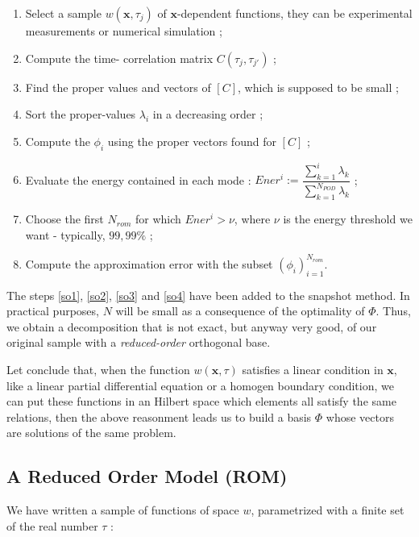 \begin{algo}\label{a_snap}
\begin{enumerate}
\item Select a sample $w(\mathbf{x},\tau_j)$ of $\mathbf{x}$-dependent functions, %
they can be experimental measurements or numerical simulation ;
\item Compute the \og{}time-\fg{} correlation matrix $C(\tau_j ,\tau_{j'})$ ;
\item Find the proper values and vectors of $[C]$, which is supposed to be small ;
\item\label{so1} Sort the proper-values $\lambda_i$ in a decreasing order ;
\item Compute the $\phi_i$ using the proper vectors found for $[C]$ ;
\item\label{so2} Evaluate the energy contained in each mode : $Ener^i:=\dfrac{\sum\limits_{k=1}^i\lambda_k}{\sum\limits_{k=1}^{N_{POD}}\lambda_k}$ ;
\item\label{so3} Choose the first $N_{rom}$ for which $Ener^i >\nu$, where $\nu$ is the energy threshold we want - typically, $99,99\%$ ;
\item\label{so4} Compute the approximation error with the subset $(\phi_i)_{i=1}^{N_{rom}}$.
\end{enumerate}
\end{algo}

The steps \ref{so1}, \ref{so2}, \ref{so3} and \ref{so4} have been added to the snapshot method. %
In practical purposes, $N$ will be small as a consequence of the optimality of $\Phi$. %
Thus, we obtain a decomposition that is not exact, but anyway very good, of our original sample with a \emph{reduced-order} orthogonal base.

\ligneinter
Let conclude that, when the function $w(\mathbf{x},\tau)$ satisfies a linear condition in $\mathbf{x}$, %
like a linear partial differential equation or a homogen boundary condition, %
we can put these functions in an Hilbert space which elements all satisfy the same relations, %
then the above reasonment leads us to build a basis $\Phi$ whose vectors are solutions of the same problem.

\subsection{A Reduced Order Model (ROM)}

We have written a sample of functions of space $w$, parametrized with a finite set of the real number $\tau$ :

